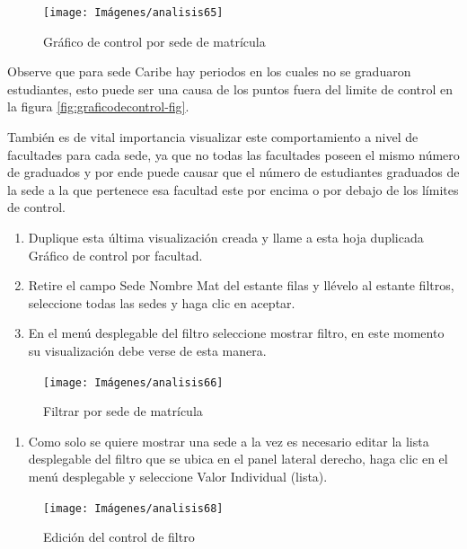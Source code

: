 \documentclass[
]{book}
\providecommand{\tightlist}{%
  \setlength{\itemsep}{0pt}\setlength{\parskip}{0pt}}
\begin{document}
\begin{figure}

{\centering \texttt{[image: Imágenes/analisis65]} 

}

\caption{Gráfico de control por sede de matrícula}\label{fig:controlsede-fig}
\end{figure}

Observe que para sede Caribe hay periodos en los cuales no se graduaron estudiantes, esto puede ser una causa de los puntos fuera del limite de control en la figura \ref{fig:graficodecontrol-fig}.

También es de vital importancia visualizar este comportamiento a nivel de facultades para cada sede, ya que no todas las facultades poseen el mismo número de graduados y por ende puede causar que el número de estudiantes graduados de la sede a la que pertenece esa facultad este por encima o por debajo de los límites de control.

\begin{enumerate}
\def\labelenumi{\arabic{enumi}.}
\item
  Duplique esta última visualización creada y llame a esta hoja duplicada Gráfico de control por facultad.
\item
  Retire el campo Sede Nombre Mat del estante filas y llévelo al estante filtros, seleccione todas las sedes y haga clic en aceptar.
\item
  En el menú desplegable del filtro seleccione mostrar filtro, en este momento su visualización debe verse de esta manera.
\end{enumerate}

\begin{figure}

{\centering \texttt{[image: Imágenes/analisis66]} 

}

\caption{Filtrar por sede de matrícula}\label{fig:paso3controlfacultad-fig}
\end{figure}

\begin{enumerate}
\def\labelenumi{\arabic{enumi}.}
\setcounter{enumi}{3}
\tightlist
\item
  Como solo se quiere mostrar una sede a la vez es necesario editar la lista desplegable del filtro que se ubica en el panel lateral derecho, haga clic en el menú desplegable y seleccione Valor Individual (lista).
\end{enumerate}

\begin{figure}

{\centering \texttt{[image: Imágenes/analisis68]} 

}

\caption{Edición del control de filtro}\label{fig:paso4controlfacultad-fig}
\end{figure}
\end{document}
